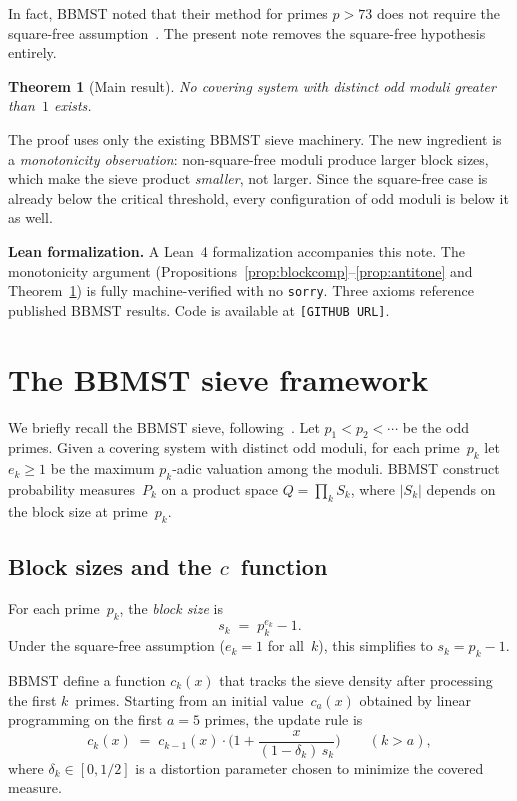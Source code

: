 \documentclass[11pt]{amsart}
\newtheorem{theorem}{Theorem}[section]
\theoremstyle{definition}
\theoremstyle{remark}
\begin{document}
In fact, BBMST noted that their method for primes $p > 73$ does not require the square-free
assumption~\cite[p.~625]{BBMST2019}. The present note removes the square-free hypothesis entirely.

\begin{theorem}[Main result]\label{thm:main}
No covering system with distinct odd moduli greater than~$1$ exists.
\end{theorem}

The proof uses only the existing BBMST sieve machinery. The new ingredient is a
\emph{monotonicity observation}: non-square-free moduli produce larger block sizes, which
make the sieve product \emph{smaller}, not larger. Since the square-free case is already
below the critical threshold, every configuration of odd moduli is below it as well.

\smallskip
\noindent\textbf{Lean formalization.}
A Lean~4 formalization accompanies this note.
The monotonicity argument (Propositions~\ref{prop:blockcomp}--\ref{prop:antitone}
and Theorem~\ref{thm:main}) is fully machine-verified with no \texttt{sorry}.
Three axioms reference published BBMST results.
Code is available at \texttt{[GITHUB URL]}.

\section{The BBMST sieve framework}

We briefly recall the BBMST sieve, following~\cite{BBMST2019}.
Let $p_1 < p_2 < \cdots$ be the odd primes. Given a covering system with distinct odd moduli,
for each prime~$p_k$ let $e_k \geq 1$ be the maximum $p_k$-adic valuation among the moduli.
BBMST construct probability measures~$P_k$ on a product space
$Q = \prod_k S_k$, where $|S_k|$ depends on the block size at prime~$p_k$.

\subsection{Block sizes and the $c$~function}
For each prime~$p_k$, the \emph{block size} is
\[
  s_k \;=\; p_k^{e_k} - 1.
\]
Under the square-free assumption ($e_k = 1$ for all~$k$), this simplifies to $s_k = p_k - 1$.

BBMST define a function $c_k(x)$ that tracks the sieve density after processing
the first $k$~primes. Starting from an initial value~$c_a(x)$ obtained by linear programming
on the first $a = 5$ primes, the update rule is
\begin{equation}\label{eq:update}
  c_k(x) \;=\; c_{k-1}(x) \cdot \biggl(1 + \frac{x}{(1-\delta_k)\, s_k}\biggr)
  \qquad (k > a),
\end{equation}
where $\delta_k \in [0, 1/2]$ is a distortion parameter chosen to minimize the covered measure.
\end{document}
